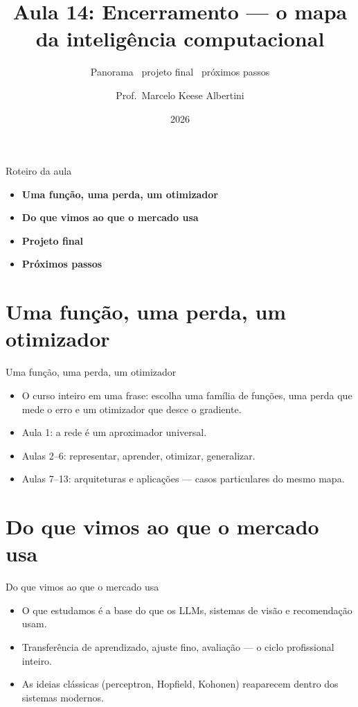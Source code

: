 \documentclass[aspectratio=169, 11pt]{beamer}
\title[Aula 14 — Encerramento]{Aula 14: Encerramento — o mapa da inteligência computacional}
\subtitle[GBC073 — Inteligência Computacional]{Panorama \textbullet\ projeto final \textbullet\ próximos passos}
\author[Prof.\ Marcelo Albertini]{Prof.\ Marcelo Keese Albertini}
\institute{GBC073 — Inteligência Computacional \textbullet\ Universidade Federal de Uberlândia}
\date{2026}
\begin{document}
\begin{frame}
  \titlepage
\end{frame}

\begin{frame}{Roteiro da aula}
  \begin{itemize}\setlength{\itemsep}{0.5ex}
    \item<1-> \textbf{Uma função, uma perda, um otimizador}
    \item<2-> \textbf{Do que vimos ao que o mercado usa}
    \item<3-> \textbf{Projeto final}
    \item<4-> \textbf{Próximos passos}
  \end{itemize}
\end{frame}

\section{Uma função, uma perda, um otimizador}

\begin{frame}{Uma função, uma perda, um otimizador}
  \begin{itemize}\setlength{\itemsep}{0.4ex}
    \item O curso inteiro em uma frase: escolha uma família de funções,
          uma perda que mede o erro e um otimizador que desce o gradiente.
    \item Aula 1: a rede é um aproximador universal.
    \item Aulas 2--6: representar, aprender, otimizar, generalizar.
    \item Aulas 7--13: arquiteturas e aplicações — casos particulares do
          mesmo mapa.
  \end{itemize}
\end{frame}

\section{Do que vimos ao que o mercado usa}

\begin{frame}{Do que vimos ao que o mercado usa}
  \begin{itemize}\setlength{\itemsep}{0.4ex}
    \item O que estudamos é a base do que os LLMs, sistemas de visão e
          recomendação usam.
    \item Transferência de aprendizado, ajuste fino, avaliação — o ciclo
          profissional inteiro.
    \item As ideias clássicas (perceptron, Hopfield, Kohonen) reaparecem
          dentro dos sistemas modernos.
  \end{itemize}
\end{frame}
\end{document}
